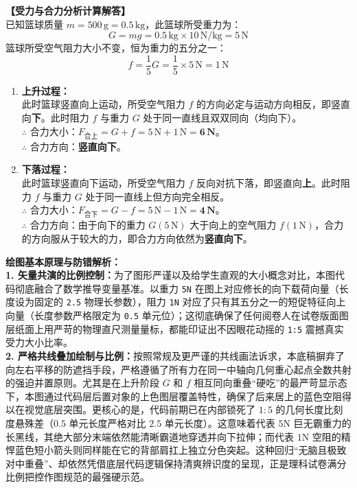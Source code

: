 \vspace{0.4cm}

\textbf{【受力与合力分析计算解答】}\\
已知篮球质量 $m = 500\,\text{g} = 0.5\,\text{kg}$，此篮球所受重力为：
$$ G = mg = 0.5\,\text{kg} \times 10\,\text{N/kg} = 5\,\text{N} $$
篮球所受空气阻力大小不变，恒为重力的五分之一：
$$ f = \frac{1}{5} G = \frac{1}{5} \times 5\,\text{N} = 1\,\text{N} $$

\begin{enumerate}
    \item \textbf{上升过程：}\\
    此时篮球竖直向上运动，所受空气阻力 $f$ 的方向必定与运动方向相反，即竖直向\textbf{下}。此时阻力 $f$ 与重力 $G$ 处于同一直线且双双同向（均向下）。\\
    $\therefore$ 合力大小：$F_{\text{合上}} = G + f = 5\,\text{N} + 1\,\text{N} = \mathbf{6\,\text{N}}$。\\
    $\therefore$ 合力方向：\textbf{竖直向下}。
    
    \item \textbf{下落过程：}\\
    此时篮球竖直向下运动，所受空气阻力 $f$ 反向对抗下落，即竖直向\textbf{上}。此时阻力 $f$ 与重力 $G$ 处于同一直线上但方向完全相反。\\
    $\therefore$ 合力大小：$F_{\text{合下}} = G - f = 5\,\text{N} - 1\,\text{N} = \mathbf{4\,\text{N}}$。\\
    $\therefore$ 合力方向：由于向下的重力 $G (5\,\text{N})$ 大于向上的空气阻力 $f (1\,\text{N})$，合力的方向服从于较大的力，即合力方向依然为\textbf{竖直向下}。
\end{enumerate}

\vspace{0.6cm}

{\small\color{blue!70!black}
\textbf{绘图基本原理与防错解析：}\\
\textbf{1. 矢量共演的比例控制：}为了图形严谨以及给学生直观的大小概念对比，本图代码彻底融合了数学推导变量基准。以重力 \texttt{5N} 在图上对应修长的向下载荷向量（长度设为固定的 \texttt{2.5} 物理长参数），阻力 \texttt{1N} 对应了只有其五分之一的短促特征向上向量（长度参数严格限定为 \texttt{0.5} 单元位）；这彻底确保了任何阅卷人在试卷版面图层纸面上用严苛的物理直尺测量量标，都能印证出不因眼花动摇的 \texttt{1:5} 震撼真实受力大小比率。\\
\textbf{2. 严格共线叠加绘制与比例：}按照常规及更严谨的共线画法诉求，本底稿摒弃了向左右平移的防遮挡手段，严格遵循了所有力在同一中轴向几何重心起点全数共射的强迫并置原则。尤其是在上升阶段 $G$ 和 $f$ 相互同向重叠“硬吃”的最严苛显示态下，本图通过代码层后置对象的上色图层覆盖特性，确保了后来居上的蓝色空阻得以在视觉底层突围。更核心的是，代码前期已在内部锁死了 $1:5$ 的几何长度比刻度悬殊差（$0.5$ 单元长度严格对比 $2.5$ 单元长度）。这意味着代表 $5\text{N}$ 巨无霸重力的长黑线，其绝大部分末端依然能清晰霸道地穿透并向下拉伸；而代表 $1\text{N}$ 空阻的精悍蓝色短小箭头则同样能在它的背部肩扛上独立分色突起。这种回归“无脑且极致对中重叠”、却依然凭借底层代码逻辑保持清爽辨识度的呈现，正是理科试卷满分比例把控作图规范的最强硬示范。
}


